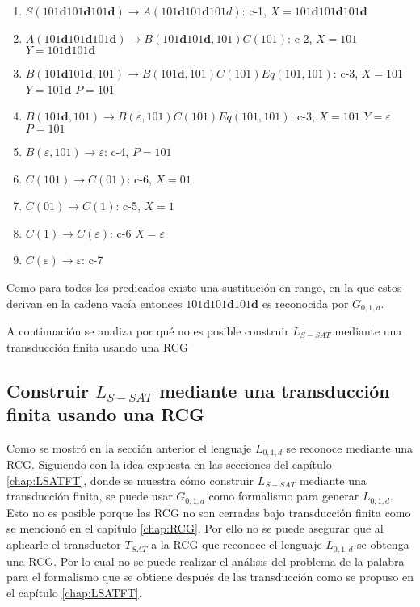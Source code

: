 \begin{enumerate}
    \item $S(101\mathbf{d}101\mathbf{d}101\mathbf{d}) \to A(101\mathbf{d}101\mathbf{d}101d)$: c-1, $X=101\mathbf{d}101\mathbf{d}101\mathbf{d}$
    \item $A(101\mathbf{d}101\mathbf{d}101\mathbf{d}) \to B(101\mathbf{d}101\mathbf{d},101)C(101)$: c-2, $X=101$ $Y=101\mathbf{d}101\mathbf{d}$
    \item $B(101\mathbf{d}101\mathbf{d},101) \to B(101\mathbf{d},101)C(101)Eq(101,101)$: c-3, $X=101$ $Y=101\mathbf{d}$ $P=101$
    \item $B(101\mathbf{d},101) \to B(\varepsilon,101)C(101)Eq(101,101)$: c-3, $X=101$ $Y=\varepsilon$ $P=101$
    \item $B(\varepsilon,101) \to \varepsilon$: c-4, $P=101$
    \item $C(101)\to C(01)$: c-6, $X=01$
    \item $C(01)\to C(1)$: c-5, $X=1$
    \item $C(1)\to C(\varepsilon)$: c-6 $X=\varepsilon$
    \item $C(\varepsilon)\to \varepsilon$: c-7
\end{enumerate}

Como para todos los predicados existe una sustitución en rango, en la que estos derivan en la cadena vacía
entonces $101\mathbf{d}101\mathbf{d}101\mathbf{d}$ es reconocida por $G_{0,1,d}$.

A continuación se analiza por qué no es posible construir $L_{S-SAT}$ mediante una transducción finita usando
una RCG

\subsection{Construir $L_{S-SAT}$ mediante una transducción finita usando una RCG}

Como se mostró en la sección anterior el lenguaje $L_{0,1,d}$ se reconoce mediante una RCG.  Siguiendo con la
idea expuesta en las secciones del capítulo \ref{chap:LSATFT}, donde se muestra cómo construir $L_{S-SAT}$
mediante una transducción finita, se puede usar $G_{0,1,d}$ como formalismo para generar $L_{0,1,d}$.
Esto no es posible porque las RCG no son cerradas bajo transducción finita como se mencionó en el
capítulo \ref{chap:RCG}.  Por ello no se puede asegurar que al aplicarle el transductor $T_{SAT}$ a
la RCG que reconoce el lenguaje $L_{0,1,d}$ se obtenga una RCG. Por lo cual no se puede realizar el
análisis del problema de la palabra para el formalismo que se obtiene después de las transducción
como se propuso en el capítulo \ref{chap:LSATFT}.

